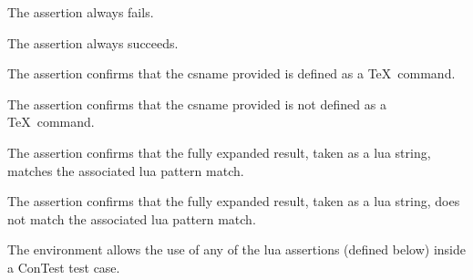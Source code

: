 
\startMkIVCode
\def\startAssertThrowsError{%
  \directlua{thirddata.contests.preAsserConTest(true)}
}

\def\stopAssertThrowsError{%
  \directlua{thirddata.contests.postAssertConTest()}
}
\stopMkIVCode

\stopTestSuite

\startTestSuite[assertDoesNotThrowError]

\stopTestSuite

\startTestSuite[assertFail]

The \type{\assertFail} assertion always fails.

\startMkIVCode
\def\assertFail#1{\errmessage{(Failure) #1}}
\stopMkIVCode

\stopTestSuite

\startTestSuite[assertSucceed]

The \type{\assertSucceed} assertion always succeeds.

\stopTestSuite

\startTestSuite[assertDefined]

The \type{\assertDefined} assertion confirms that the csname provided 
is defined as a \TeX\ command. 






\stopTestSuite

\startTestSuite[assertNotDefined]

The \type{\assertNotDefined} assertion confirms that the csname provided 
is not defined as a \TeX\ command. 

\stopTestSuite

\startTestSuite[assertStringMatches]

The \type{\assertStringMatches} assertion confirms that the fully expanded 
result, taken as a lua string, matches the associated lua pattern match. 

\stopTestSuite

\startTestSuite[assertStringDoesNotMatch]

The \type{\assertStringDoesNotMatch} assertion confirms that the fully expanded 
result, taken as a lua string, does not match the associated lua pattern match. 

\stopTestSuite

\startTestSuite[assertLua]

The  environment allows the use of any of the lua 
assertions (defined below) inside a ConTest test case. 

\stopTestSuite

\stopchapter